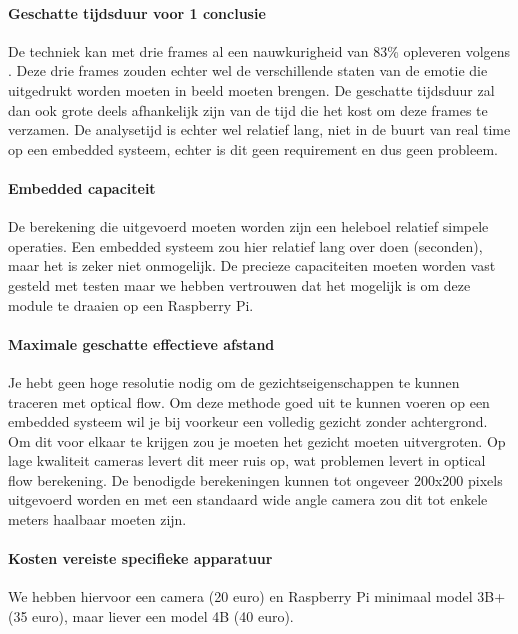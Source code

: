 \documentclass[11pt]{article}
\begin{document}
    \paragraph{Geschatte tijdsduur voor 1 conclusie}
    De techniek kan met drie frames al een nauwkurigheid van 83\% opleveren volgens \emph{\citet{naghsh2006efficient}}.
    Deze drie frames zouden echter wel de verschillende staten van de emotie die uitgedrukt worden moeten in beeld moeten brengen.
    De geschatte tijdsduur zal dan ook grote deels afhankelijk zijn van de tijd die het kost om deze frames te verzamen.
    De analysetijd is echter wel relatief lang, niet in de buurt van real time op een embedded systeem, echter is dit geen requirement en dus geen probleem.

    \paragraph{Embedded capaciteit}
    De berekening die uitgevoerd moeten worden zijn een heleboel relatief simpele operaties.
    Een embedded systeem zou hier relatief lang over doen (seconden), maar het is zeker niet onmogelijk.
    De precieze capaciteiten moeten worden vast gesteld met testen maar we hebben vertrouwen dat het mogelijk is om deze module te draaien op een Raspberry Pi.

    \paragraph{Maximale geschatte effectieve afstand}
    Je hebt geen hoge resolutie nodig om de gezichtseigenschappen te kunnen traceren met optical flow.
    Om deze methode goed uit te kunnen voeren op een embedded systeem wil je bij voorkeur een volledig gezicht zonder achtergrond.
    Om dit voor elkaar te krijgen zou je moeten het gezicht moeten uitvergroten.
    Op lage kwaliteit cameras levert dit meer ruis op, wat problemen levert in optical flow berekening.
    De benodigde berekeningen kunnen tot ongeveer 200x200 pixels uitgevoerd worden en met een standaard wide angle camera zou dit tot enkele meters haalbaar moeten zijn.

    \paragraph{Kosten vereiste specifieke apparatuur}
    We hebben hiervoor een camera (20 euro) en Raspberry Pi minimaal model 3B+ (35 euro), maar liever een model 4B (40 euro).
\end{document}
